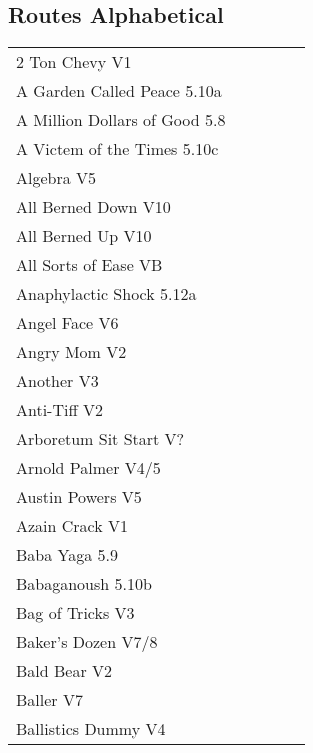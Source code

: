 \begin{flushleft}

\needspace{1.5cm}
\section{Routes Alphabetical}
\begin{center}
\begin{supertabular}{p{0.76\linewidth}p{0.08\linewidth}}
2 Ton Chevy V1 & \pageref{rt:2 Ton Chevy} \\
A Garden Called Peace 5.10a & \pageref{rt:A Garden Called Peace} \\
A Million Dollars of Good 5.8 & \pageref{rt:A Million Dollars of Good} \\
A Victem of the Times 5.10c & \pageref{vr:A Victem of the Times} \\
Algebra V5 & \pageref{rt:Algebra} \\
All Berned Down V10 & \pageref{rt:All Berned Down} \\
All Berned Up V10 & \pageref{rt:All Berned Up} \\
All Sorts of Ease VB & \pageref{rt:All Sorts of Ease} \\
Anaphylactic Shock 5.12a & \pageref{rt:Anaphylactic Shock} \\
Angel Face V6 & \pageref{rt:Angel Face} \\
Angry Mom V2 & \pageref{rt:Angry Mom} \\
Another V3 & \pageref{rt:Another} \\
Anti-Tiff V2 & \pageref{rt:Anti-Tiff} \\
Arboretum Sit Start V? & \pageref{vr:Arboretum Sit Start} \\
Arnold Palmer V4/5 & \pageref{vr:Arnold Palmer} \\
Austin Powers V5 & \pageref{rt:Austin Powers} \\
Azain Crack V1 & \pageref{vr:Azain Crack} \\
Baba Yaga 5.9 & \pageref{rt:Baba Yaga} \\
Babaganoush 5.10b & \pageref{rt:Babaganoush} \\
Bag of Tricks V3 & \pageref{vr:Bag of Tricks} \\
Baker's Dozen V7/8 & \pageref{vr:Baker's Dozen} \\
Bald Bear V2 & \pageref{rt:Bald Bear} \\
Baller V7 & \pageref{vr:Baller} \\
Ballistics Dummy V4 & \pageref{rt:Ballistics Dummy} \\

\end{supertabular}
\end{center}
\end{flushleft}
